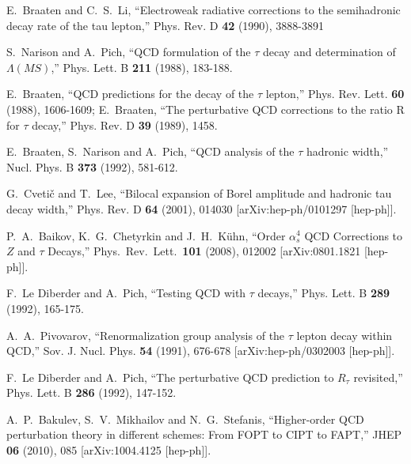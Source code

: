 \documentclass[aps,nofootinbib,showkeys,noshowpacs,preprintnumbers,amsmath,amssymb]{revtex4}
\begin{document}
\begin{thebibliography}{99}
E.~Braaten and C.~S.~Li,
``Electroweak radiative corrections to the semihadronic decay rate of the tau lepton,''
Phys. Rev. D \textbf{42} (1990), 3888-3891
  
S.~Narison and A.~Pich,
``QCD formulation of the $\tau$ decay and determination of $\Lambda(MS)$,''
Phys. Lett. B \textbf{211} (1988), 183-188.

E.~Braaten,
``QCD predictions for the decay of the $\tau$ lepton,''
Phys. Rev. Lett. \textbf{60} (1988), 1606-1609;
E.~Braaten,
``The perturbative QCD corrections to the ratio R for $\tau$ decay,''
Phys. Rev. D \textbf{39} (1989), 1458.

E.~Braaten, S.~Narison and A.~Pich,
``QCD analysis of the $\tau$ hadronic width,''
Nucl. Phys. B \textbf{373} (1992), 581-612.

G.~Cveti\v{c} and T.~Lee,
``Bilocal expansion of Borel amplitude and hadronic tau decay width,''
Phys. Rev. D \textbf{64} (2001), 014030
[arXiv:hep-ph/0101297 [hep-ph]].
  
  P.~A.~Baikov, K.~G.~Chetyrkin and J.~H.~K\"uhn,
  ``Order $\alpha_s^4$ QCD Corrections to $Z$ and $\tau$ Decays,''
  Phys.\ Rev.\ Lett.\  {\bf 101} (2008), 012002
  [arXiv:0801.1821 [hep-ph]].

F.~Le Diberder and A.~Pich,
``Testing QCD with $\tau$ decays,''
Phys. Lett. B \textbf{289} (1992), 165-175.

A.~A.~Pivovarov,
``Renormalization group analysis of the $\tau$ lepton decay within QCD,''
Sov. J. Nucl. Phys. \textbf{54} (1991), 676-678
[arXiv:hep-ph/0302003 [hep-ph]].

F.~Le Diberder and A.~Pich,
``The perturbative QCD prediction to $R_{\tau}$ revisited,''
Phys. Lett. B \textbf{286} (1992), 147-152.

A.~P.~Bakulev, S.~V.~Mikhailov and N.~G.~Stefanis,
``Higher-order QCD perturbation theory in different schemes: From FOPT to CIPT to FAPT,''
JHEP \textbf{06} (2010), 085
[arXiv:1004.4125 [hep-ph]].  


\end{thebibliography}
\end{document}
